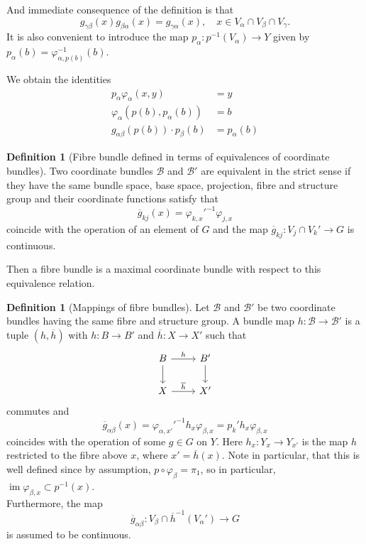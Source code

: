 \documentclass[reqno]{amsart}
\theoremstyle{definition}
\newtheorem{definition}[theorem]{Definition}
\theoremstyle{remark}
\DeclareMathOperator{\im}{im}
\begin{document}
And immediate consequence of the definition is that
\[
g_{\gamma \beta} (x) g_{\beta \alpha}(x) = 
g_{\gamma \alpha}(x), \quad x \in V_{\alpha} \cap V_{\beta}
\cap V_{\gamma}.
\] 
It is also convenient to introduce the map
$p_{\alpha} \colon p^{-1}(V_{\alpha}) \to Y$ given by
$p_{\alpha}(b) = \varphi_{\alpha,p(b)}^{-1}(b)$.

We obtain the identities
\begin{align*}
    p_\alpha \varphi_\alpha (x,y) &= y \tag{$A_1$}\\
    \varphi_\alpha \left( p(b), p_\alpha(b) \right) &= b\tag{$A_2$ }\\
    g_{\alpha \beta}\left( p(b) \right) \cdot 
    p_\beta(b) &= p_\alpha(b)\tag{$A_3$}\label{A-3}
\end{align*}

\begin{definition}[Fibre bundle defined
    in terms of equivalences of coordinate bundles]
    Two coordinate bundles
    $\mathcal{B}$ and $\mathcal{B}'$ are
    equivalent in the strict sense if they
    have the same bundle space, base space, projection,
    fibre and structure group and their coordinate functions
    satisfy that
    \[
    \overline{g}_{kj}(x) = \varphi_{k,x}'^{-1} \varphi_{j,x}
    \] 
    coincide with the operation of an element of $G$ and the
    map
    $\overline{g}_{kj} \colon
    V_j \cap V_{k}' \to G$ is continuous.

    Then a fibre bundle is a maximal coordinate bundle
    with respect to this equivalence relation.
\end{definition}

\begin{definition}[Mappings of fibre bundles]
    Let $\mathcal{B}$ and $\mathcal{B}'$ be two
    coordinate bundles having the same fibre and structure group.
    A bundle map $h \colon \mathcal{B} \to \mathcal{B}'$ 
    is a tuple 
    $\left( h, \overline{h} \right) $ with
    $h \colon B \to B'$ and $\overline{h} \colon X \to X'$ 
    such that
    \begin{equation*}
    \begin{tikzcd}
        B \ar[d] \ar[r, "h"] & B' \ar[d] \\
        X \ar[r, "\overline{h}"] & X'
    \end{tikzcd}
    \end{equation*}
    commutes and
    \[
    \overline{g}_{\alpha \beta}(x) = 
    \varphi_{\alpha, x'}'^{-1} h_x \varphi_{\beta ,x} =
    p_k' h_x \varphi_{\beta, x}
    \] 
    coincides with the operation of some $g \in G$ on
    $Y$. Here $h_x \colon Y_x \to Y_{x'}$ is the map
    $h$ restricted to the
    fibre  above $x$, where $x' = \overline{h}(x)$.
    Note in particular, that this is well defined
    since by assumption,
    $p \circ \varphi_{\beta} = \pi_1$, so
    in particular, $\im \varphi_{\beta, x} \subset 
    p^{-1}(x)$.\\
    Furthermore, the map
    \[
    \overline{g}_{\alpha \beta}\colon
    V_{\beta} \cap \overline{h}^{-1}\left( V_{\alpha}' \right) 
    \to G
    \] is assumed to be continuous.
\end{definition}
\end{document}
